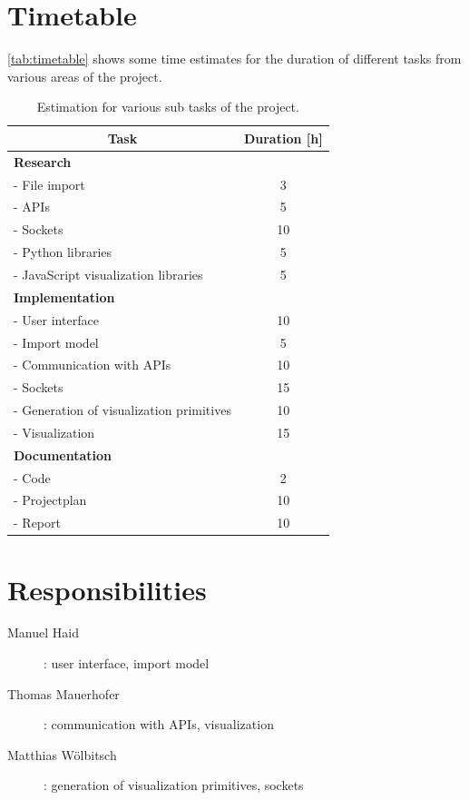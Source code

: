 \documentclass[12pt, a4paper]{article}
\begin{document}
\section{Timetable}

\autoref{tab:timetable} shows some time estimates for the duration of different tasks from various areas of the project. 

\begin{table}[ht!]
\centering
\begin{tabular}{|l|c|}
\hline
\multicolumn{1}{|c|}{\textbf{Task}} & \textbf{Duration [h]} \\ \hline
\textbf{Research} &  \\ \hline
  - File import & 3 \\ \hline
  - APIs & 5 \\ \hline
  - Sockets & 10 \\ \hline
  - Python libraries & 5 \\ \hline
  - JavaScript visualization libraries & 5 \\ \hline
\textbf{Implementation} &  \\ \hline
  - User interface & 10 \\ \hline
  - Import model & 5 \\ \hline
  - Communication with APIs & 10 \\ \hline
  - Sockets & 15 \\ \hline
  - Generation of visualization primitives & 10 \\ \hline
  - Visualization & 15 \\ \hline
\textbf{Documentation} &  \\ \hline
  - Code & 2 \\ \hline
  - Projectplan & 10 \\ \hline
  - Report & 10 \\ \hline
\end{tabular}
\caption{Estimation for various sub tasks of the project.}
\label{tab:timetable}
\end{table}


\section{Responsibilities}

\begin{description}
 \item[Manuel Haid]: user interface, import model
 \item[Thomas Mauerhofer]: communication with APIs, visualization 
 \item[Matthias Wölbitsch]: generation of visualization primitives, sockets
\end{description}
\end{document}
